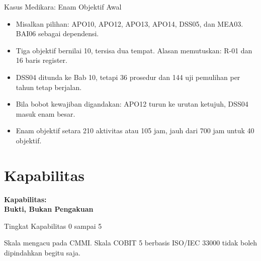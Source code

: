\documentclass[aspectratio=169, table, 12pt]{beamer}
\begin{document}
\begin{frame}{{\Large Kasus Medikara: Enam Objektif Awal}}
  \vspace{4pt}
  \small
  \begin{itemize}
    \item Misalkan pilihan: APO10, APO12, APO13, APO14, DSS05, dan MEA03. BAI06 sebagai dependensi.
    \item Tiga objektif bernilai 10, tersisa dua tempat. Alasan memutuskan: R-01 dan 16 baris register.
    \item DSS04 ditunda ke Bab 10, tetapi 36 prosedur dan 144 uji pemulihan per tahun tetap berjalan.
    \item Bila bobot kewajiban digandakan: APO12 turun ke urutan ketujuh, DSS04 masuk enam besar.
    \item Enam objektif setara 210 aktivitas atau 105 jam, jauh dari 700 jam untuk 40 objektif.
  \end{itemize}
\end{frame}

\section{Kapabilitas}

\begin{frame}{\hfill}
  \centering
  \Huge{\textbf{Kapabilitas:\\Bukti, Bukan Pengakuan}}
\end{frame}

\begin{frame}{{\Large Tingkat Kapabilitas 0 sampai 5}}
  \centering
  \vspace{6pt}
  

  \vspace{6pt}
  \raggedright\small Skala mengacu pada CMMI. Skala COBIT 5 berbasis ISO/IEC 33000 tidak boleh dipindahkan begitu saja.
\end{frame}
\end{document}
